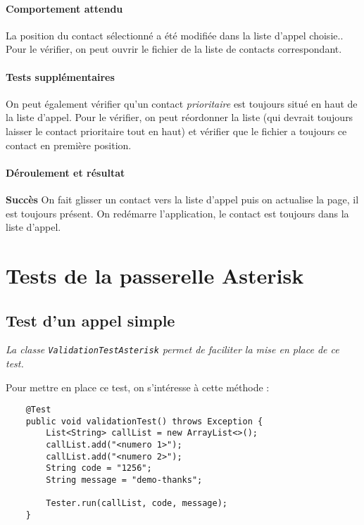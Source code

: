 \documentclass{article}
\begin{document}
\paragraph{Comportement attendu\\}

La position du contact sélectionné a été modifiée dans la liste d'appel choisie..\\
Pour le vérifier, on peut ouvrir le fichier de la liste de contacts correspondant.

\paragraph{Tests supplémentaires\\}

On peut également vérifier qu'un contact \emph{prioritaire} est toujours situé en haut de la liste d'appel. Pour le vérifier, on peut réordonner la liste (qui devrait toujours laisser le contact prioritaire tout en haut) et vérifier que le fichier a toujours ce contact en première position.

\paragraph{Déroulement et résultat\\} 

\textbf{Succès} On fait glisser un contact vers la liste d'appel puis on actualise la page, il est toujours présent. On redémarre l'application, le contact est toujours dans la liste d'appel.

\pagebreak
\section{Tests de la passerelle Asterisk}

\subsection{Test d'un appel simple}

\textit{La classe \texttt{ValidationTestAsterisk} permet de faciliter la mise en place de ce test.}

Pour mettre en place ce test, on s'intéresse à cette méthode :

\begin{lstlisting}
    @Test
    public void validationTest() throws Exception {
        List<String> callList = new ArrayList<>();
        callList.add("<numero 1>");
        callList.add("<numero 2>");
        String code = "1256";
        String message = "demo-thanks";

        Tester.run(callList, code, message);
    }
\end{lstlisting}
\end{document}
